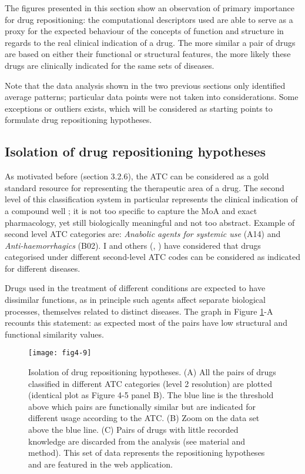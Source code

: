 The figures presented in this section show an observation of primary importance for drug repositioning: the computational descriptors used are able to serve as a proxy for the expected behaviour of the concepts of function and structure in regards to the real clinical indication of a drug. The more similar a pair of drugs are based on either their functional or structural features, the more likely these drugs are clinically indicated for the same sets of diseases.

Note that the data analysis shown in the two previous sections only identified average patterns; particular data points were not taken into considerations. Some exceptions or outliers exists, which will be considered as starting points to formulate drug repositioning hypotheses.

\subsection{Isolation of drug repositioning hypotheses}
As motivated before (section 3.2.6), the ATC can be considered as a gold standard resource for representing the therapeutic area of a drug. The second level of this classification system in particular represents the clinical indication of a compound well \citep{world2006anatomical}; it is not too specific to capture the MoA and exact pharmacology, yet still biologically meaningful and not too abstract. Example of second level ATC categories are: \emph{Anabolic agents for systemic use} (A14) and \emph{Anti-haemorrhagics} (B02). I and others (\cite{campillos2008drug}, \cite{napolitano2013drug}) have considered that drugs categorised under different second-level ATC codes can be considered as indicated for different diseases.

Drugs used in the treatment of different conditions are expected to have dissimilar functions, as in principle such agents affect separate biological processes, themselves related to distinct diseases. The graph in Figure \ref{fig4-9}-A recounts this statement: as expected most of the pairs have low structural and functional similarity values.

\begin{figure}[ht]
    \centering
    \texttt{[image: fig4-9]}
    \caption{Isolation of drug repositioning hypotheses. (A) All the pairs of drugs classified in different ATC categories (level 2 resolution) are plotted (identical plot as Figure 4-5 panel B). The blue line is the threshold above which pairs are functionally similar but are indicated for different usage according to the ATC. (B) Zoom on the data set above the blue line. (C) Pairs of drugs with little recorded knowledge are discarded from the analysis (see material and method). This set of data represents the repositioning hypotheses and are featured in the web application.}
    \label{fig4-9}
\end{figure}

